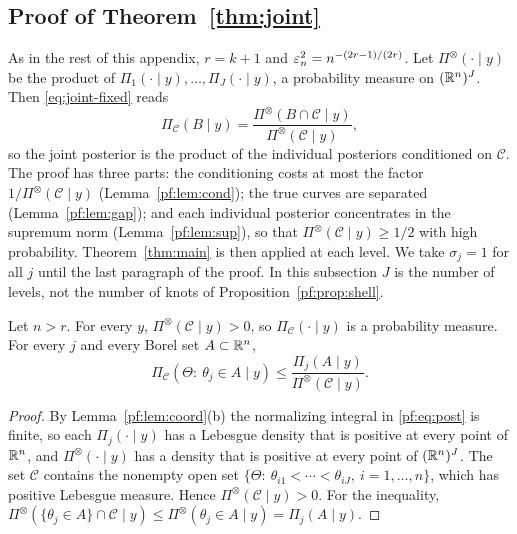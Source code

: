 \subsection{Proof of Theorem~\ref{thm:joint}}\label{pf:sec:joint}

As in the rest of this appendix, $r=k+1$ and $\varepsilon_n^2=n^{-(2r-1)/(2r)}$. Let $\Pi^{\otimes}(\cdot\mid y)$ be the product of $\Pi_1(\cdot\mid y),\dots,\Pi_J(\cdot\mid y)$, a probability measure on $(\mathbb{R}^n)^J$. Then \eqref{eq:joint-fixed} reads
\[
\Pi_{\mathcal C}(B\mid y)=\frac{\Pi^{\otimes}(B\cap\mathcal C\mid y)}{\Pi^{\otimes}(\mathcal C\mid y)} ,
\]
so the joint posterior is the product of the individual posteriors conditioned on $\mathcal C$. The proof has three parts: the conditioning costs at most the factor $1/\Pi^{\otimes}(\mathcal C\mid y)$ (Lemma~\ref{pf:lem:cond}); the true curves are separated (Lemma~\ref{pf:lem:gap}); and each individual posterior concentrates in the supremum norm (Lemma~\ref{pf:lem:sup}), so that $\Pi^{\otimes}(\mathcal C\mid y)\ge1/2$ with high probability. Theorem~\ref{thm:main} is then applied at each level. We take $\sigma_j=1$ for all $j$ until the last paragraph of the proof. In this subsection $J$ is the number of levels, not the number of knots of Proposition~\ref{pf:prop:shell}.

\begin{lemma}[conditioning]\label{pf:lem:cond}
Let $n>r$. For every $y$, $\Pi^{\otimes}(\mathcal C\mid y)>0$, so $\Pi_{\mathcal C}(\cdot\mid y)$ is a probability measure. For every $j$ and every Borel set $A\subset\mathbb{R}^n$,
\[
\Pi_{\mathcal C}(\Theta:\ \theta_j\in A\mid y)\le\frac{\Pi_j(A\mid y)}{\Pi^{\otimes}(\mathcal C\mid y)} .
\]
\end{lemma}

\begin{proof}
By Lemma~\ref{pf:lem:coord}(b) the normalizing integral in \eqref{pf:eq:post} is finite, so each $\Pi_j(\cdot\mid y)$ has a Lebesgue density that is positive at every point of $\mathbb{R}^n$, and $\Pi^{\otimes}(\cdot\mid y)$ has a density that is positive at every point of $(\mathbb{R}^n)^J$. The set $\mathcal C$ contains the nonempty open set $\{\Theta:\ \theta_{i1}<\cdots<\theta_{iJ},\ i=1,\dots,n\}$, which has positive Lebesgue measure. Hence $\Pi^{\otimes}(\mathcal C\mid y)>0$. For the inequality, $\Pi^{\otimes}(\{\theta_j\in A\}\cap\mathcal C\mid y)\le\Pi^{\otimes}(\theta_j\in A\mid y)=\Pi_j(A\mid y)$.
\end{proof}

